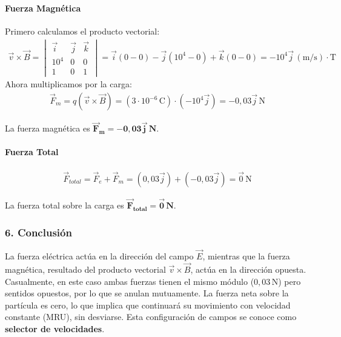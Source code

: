 \paragraph*{Fuerza Magnética}
Primero calculamos el producto vectorial:
\begin{gather}
    \vec{v} \times \vec{B} = 
    \begin{vmatrix}
        \vec{i} & \vec{j} & \vec{k} \\
        10^4 & 0 & 0 \\
        1 & 0 & 1
    \end{vmatrix}
    = \vec{i}(0-0) - \vec{j}(10^4 - 0) + \vec{k}(0-0) = -10^4 \vec{j} \, (\text{m/s})\cdot\text{T}
\end{gather}
Ahora multiplicamos por la carga:
\begin{gather}
    \vec{F}_m = q(\vec{v} \times \vec{B}) = (3 \cdot 10^{-6}\,\text{C}) \cdot (-10^4 \vec{j}) = -0,03 \vec{j} \, \text{N}
\end{gather}
\begin{cajaresultado}
    La fuerza magnética es $\boldsymbol{\vec{F}_m = -0,03 \vec{j} \, \textbf{N}}$.
\end{cajaresultado}
\paragraph*{Fuerza Total}
\begin{gather}
    \vec{F}_{total} = \vec{F}_e + \vec{F}_m = (0,03 \vec{j}) + (-0,03 \vec{j}) = \vec{0} \, \text{N}
\end{gather}
\begin{cajaresultado}
    La fuerza total sobre la carga es $\boldsymbol{\vec{F}_{total} = \vec{0} \, \textbf{N}}$.
\end{cajaresultado}

\subsubsection*{6. Conclusión}
\begin{cajaconclusion}
La fuerza eléctrica actúa en la dirección del campo $\vec{E}$, mientras que la fuerza magnética, resultado del producto vectorial $\vec{v} \times \vec{B}$, actúa en la dirección opuesta. Casualmente, en este caso ambas fuerzas tienen el mismo módulo ($0,03\,\text{N}$) pero sentidos opuestos, por lo que se anulan mutuamente. La fuerza neta sobre la partícula es cero, lo que implica que continuará su movimiento con velocidad constante (MRU), sin desviarse. Esta configuración de campos se conoce como \textbf{selector de velocidades}.
\end{cajaconclusion}

